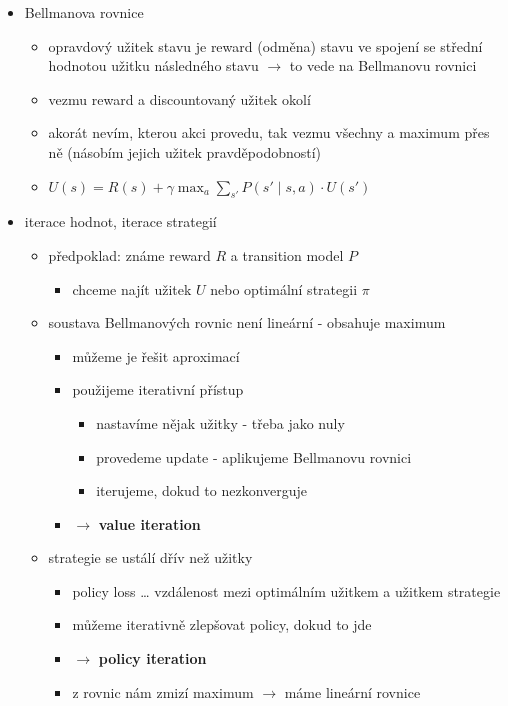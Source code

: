 \begin{itemize}
\begin{itemize}
\begin{itemize}
\end{itemize}
\end{itemize}
\item Bellmanova rovnice
\begin{itemize}
\item opravdový užitek stavu je reward (odměna) stavu ve spojení se střední hodnotou užitku následného stavu $\to$ to vede na Bellmanovu rovnici
\item vezmu reward a discountovaný užitek okolí
\item akorát nevím, kterou akci provedu, tak vezmu všechny a maximum přes ně (násobím jejich užitek pravděpodobností)
\item $U(s)=R(s)+\gamma\max_a\sum_{s'}P(s'\mid s,a)\cdot U(s')$
\end{itemize}
\item iterace hodnot, iterace strategií
\begin{itemize}
\item předpoklad: známe reward $R$ a transition model $P$
\begin{itemize}
\item chceme najít užitek $U$ nebo optimální strategii $\pi$
\end{itemize}
\item soustava Bellmanových rovnic není lineární - obsahuje maximum
\begin{itemize}
\item můžeme je řešit aproximací
\item použijeme iterativní přístup
\begin{itemize}
\item nastavíme nějak užitky - třeba jako nuly
\item provedeme update - aplikujeme Bellmanovu rovnici
\item iterujeme, dokud to nezkonverguje
\end{itemize}
\item $\to$ \textbf{value iteration}
\end{itemize}
\item strategie se ustálí dřív než užitky
\begin{itemize}
\item policy loss \dots{} vzdálenost mezi optimálním užitkem a užitkem strategie
\item můžeme iterativně zlepšovat policy, dokud to jde
\item $\to$ \textbf{policy iteration}
\item z rovnic nám zmizí maximum $\to$ máme lineární rovnice

\end{itemize}
\end{itemize}
\end{itemize}
